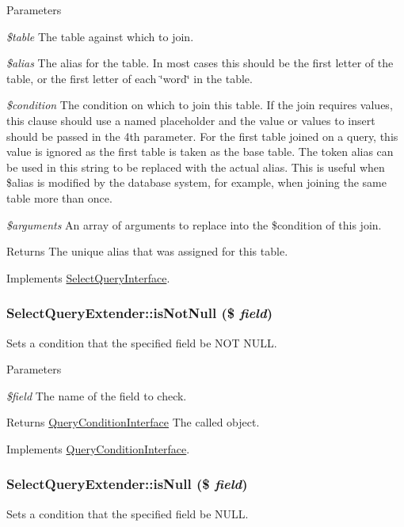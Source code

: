 \begin{DoxyParams}{Parameters}
\item[{\em \$table}]The table against which to join. \item[{\em \$alias}]The alias for the table. In most cases this should be the first letter of the table, or the first letter of each \char`\"{}word\char`\"{} in the table. \item[{\em \$condition}]The condition on which to join this table. If the join requires values, this clause should use a named placeholder and the value or values to insert should be passed in the 4th parameter. For the first table joined on a query, this value is ignored as the first table is taken as the base table. The token alias can be used in this string to be replaced with the actual alias. This is useful when \$alias is modified by the database system, for example, when joining the same table more than once. \item[{\em \$arguments}]An array of arguments to replace into the \$condition of this join. \end{DoxyParams}
\begin{DoxyReturn}{Returns}
The unique alias that was assigned for this table. 
\end{DoxyReturn}


Implements \hyperlink{interfaceSelectQueryInterface_ab359fd116625504a297d7fd4222f2564}{SelectQueryInterface}.\hypertarget{classSelectQueryExtender_a24432e3ab40f7c1ce1404d6773e539f4}{
\subsubsection[{isNotNull}]{\setlength{\rightskip}{0pt plus 5cm}SelectQueryExtender::isNotNull (\$ {\em field})}}
\label{classSelectQueryExtender_a24432e3ab40f7c1ce1404d6773e539f4}
Sets a condition that the specified field be NOT NULL.


\begin{DoxyParams}{Parameters}
\item[{\em \$field}]The name of the field to check.\end{DoxyParams}
\begin{DoxyReturn}{Returns}
\hyperlink{interfaceQueryConditionInterface}{QueryConditionInterface} The called object. 
\end{DoxyReturn}


Implements \hyperlink{interfaceQueryConditionInterface_a8bbb6acc9c72911b165cf6eb1dc31453}{QueryConditionInterface}.\hypertarget{classSelectQueryExtender_ad30e0f469cabfcc18f148468cc507cd8}{
\subsubsection[{isNull}]{\setlength{\rightskip}{0pt plus 5cm}SelectQueryExtender::isNull (\$ {\em field})}}
\label{classSelectQueryExtender_ad30e0f469cabfcc18f148468cc507cd8}
Sets a condition that the specified field be NULL.


